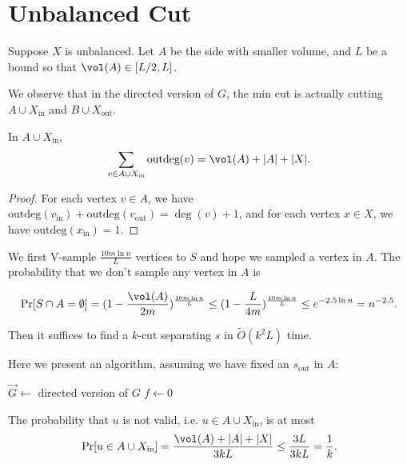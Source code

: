 \section{Unbalanced Cut}

Suppose $X$ is unbalanced. Let $A$ be the side with smaller volume, and $L$ be a bound so that $\vol(A) \in [L/2, L]$.

We observe that in the directed version of $G$, the min cut is actually cutting $A\cup X_{\text{in}}$ and $B\cup X_{\text{out}}$.

\begin{lemma}
	In $A\cup X_{\text{in}}$,
	\[ \sum_{v\in A\cup X_{\text{in}}} \text{outdeg}(v) = \vol(A)+ |A| + |X|.\]
\end{lemma}
\begin{proof}
	For each vertex $v\in A$, we have $\text{outdeg}(v_{\text{in}})+\text{outdeg}(v_{\text{out}}) = \deg(v) + 1$, and for each vertex $x\in X$, we have $\text{outdeg}(x_{\text{in}}) = 1$.
\end{proof}

We first V-sample $\frac{10m\ln n}{L}$ vertices to $S$ and hope we sampled a vertex in $A$. The probability that we don't sample any vertex in $A$ is

\[ \Pr[S\cap A = \emptyset] = (1 - \frac{\vol(A)}{2m})^{\frac{10m\ln n}{L}} \le (1 - \frac{L}{4m})^{\frac{10m\ln n}{L}} \le e^{-2.5\ln n} = n^{-2.5}. \]

Then it suffices to find a $k$-cut separating $s$ in $\tilde{O}(k^2 L)$ time.

Here we present an algorithm, assuming we have fixed an $s_\text{out}$ in $A$:

\begin{algorithm}[H]
	\caption{Unbalanced Cut}\label{alg:unbalanced-cut}
	$\vec{G}\gets$ directed version of $G$\;
	$f\gets 0$\;
\end{algorithm}

The probability that $u$ is not valid, i.e. $u\in A\cup X_{\text{in}}$, is at most
\[\Pr[u\in A\cup X_{\text{in}}] = \frac{\vol(A) + |A| + |X|}{3kL} \le \frac{3L}{3kL} = \frac{1}{k}.\]


